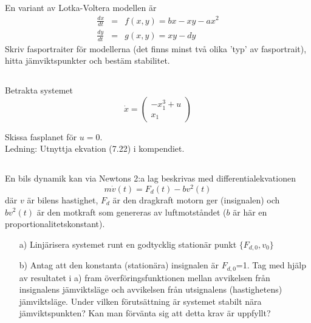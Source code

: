 \subsection{}
En variant av Lotka-Voltera modellen är
\begin{eqnarray*}
\frac{dx}{dt} & = & f(x,y) = bx-xy - ax^2  \\
\frac{dy}{dt} & = & g(x,y) =xy-dy
\end{eqnarray*}
Skriv fasportraiter för modellerna (det finns minst två olika 'typ' av fasportrait),  hitta jämviktspunkter och bestäm stabilitet.

\subsection{}
Betrakta systemet
\[
\dot{x} = \left(
\begin{array}{c}
-x_1^3 + u \\ x_1
\end{array} \right)
\]

Skissa fasplanet för $u = 0$.\\
Ledning: Utnyttja ekvation (7.22) i kompendiet.


\subsection{}
En bils dynamik kan via Newtons 2:a lag beskrivas med
differentialekvationen
\begin{equation*}
m \dot{v}(t)=F_d(t)-bv^2(t)
\end{equation*}
där $v$ är bilens hastighet, $F_d$ är den dragkraft motorn ger
(insignalen) och $bv^2(t)$ är den motkraft som genereras av
luftmotståndet ($b$ är här en proportionalitetskonstant).
\begin{itemize}
\item[a)] Linjärisera systemet runt en godtycklig stationär punkt $\{F_{d,0},v_0\}$

\item[b)] Antag att den konstanta (stationära) insignalen är
  $F_{d,0}$=1. Tag med hjälp av resultatet i a) fram
  överföringsfunktionen mellan avvikelsen från 
  insignalens jämviktsläge och avvikelsen från utsignalens
  (hastighetens) jämviktsläge. Under vilken förutsättning är systemet
  stabilt nära jämviktspunkten? Kan man förvänta sig att detta krav är
  uppfyllt?  
\end{itemize}


